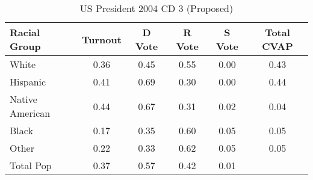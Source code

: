 \begin{table}[htb]
\begin{center}
\caption{US President 2004 CD 3 (Proposed)}
\label{pres04_cvap_cd_3}
\begin{tabular}{lccccc}
  \hline
Racial Group & Turnout & D Vote & R Vote & S Vote & Total CVAP \\ 
  \hline
White & 0.36 & 0.45 & 0.55 & 0.00 & 0.43 \\ 
  Hispanic & 0.41 & 0.69 & 0.30 & 0.00 & 0.44 \\ 
  Native American & 0.44 & 0.67 & 0.31 & 0.02 & 0.04 \\ 
  Black & 0.17 & 0.35 & 0.60 & 0.05 & 0.05 \\ 
  Other & 0.22 & 0.33 & 0.62 & 0.05 & 0.05 \\ 
  Total Pop & 0.37 & 0.57 & 0.42 & 0.01 &  \\ 
   \hline
\end{tabular}
\end{center}
\end{table}
